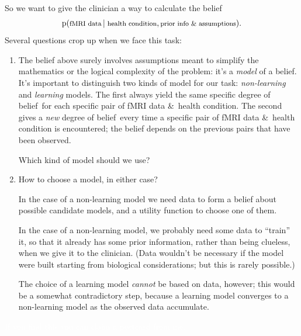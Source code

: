 \documentclass[\ifafour a4paper,12pt,\else a5paper,10pt,\fi%
onecolumn,oneside,article,%
british%
]{memoir}
\theoremstyle{remark}
\theoremstyle{innote}
\newcommand*{\amp}{\&}
\newcommand*{\pf}{\mathrm{p}}%
\renewcommand*{\|}[1][]{\nonscript\,#1\vert\nonscript\;\mathopen{}}
\newcommand*{\dob}{degree of belief}
\begin{document}
So we want to give the clinician a way to calculate the belief
\begin{equation}
  \label{eq:sought_likelihood}
  \pf(\text{\footnotesize fMRI data} \| \text{\footnotesize health condition}, \text{\footnotesize prior info \amp\ assumptions}).
\end{equation}
Several questions crop up when we face this task:
\begin{enumerate}[label=(\alph*)]
\item The belief above surely involves assumptions meant to simplify the
  mathematics or the logical complexity of the problem: it's a \emph{model}
  of a belief. It's important to distinguish two kinds of model for our
  task: \emph{non-learning} and \emph{learning} models. The first always
  yield the same specific \dob\ for each specific pair of fMRI data \amp\
  health condition. The second gives a \emph{new} \dob\ every time a specific pair
  of fMRI data \amp\ health condition is encountered; the belief depends on
  the previous pairs that have been observed.

  Which kind of model should we use?

\item How to choose a model, in either case?

  In the case of a non-learning model we need data to form a belief about
  possible candidate models, and a utility function to choose one of them.

  In the case of a non-learning model, we probably need some data to
  \enquote{train} it, so that it already has some prior information, rather
  than being clueless, when we give it to the clinician. (Data wouldn't be
  necessary if the model were built starting from biological
  considerations; but this is rarely possible.)

  The choice of a learning model \emph{cannot} be based on data, however;
  this would be a somewhat contradictory step, because a learning model
   converges to a non-learning model as the observed data
  accumulate.
\end{enumerate}




\textcolor{white}{If you find this you can claim a postcard from me.}
\end{document}
